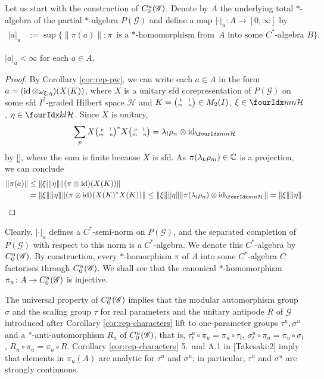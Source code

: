 Let us start with the construction of $C^{u}_{0}(\mathscr{G})$. Denote by $A$ the
underlying total $*$-algebra of the partial $*$-algebra
$P(\mathscr{G})$ and define a map $|\cdot |_{u} \colon A \to [0,\infty]$ by
\begin{align*}
  |a|_{u}&:= \sup \{ \|\pi(a)\| : \pi \text{ is a $*$-homomorphism
    from } A \text{ into some $C^{*}$-algebra } B\}.
\end{align*}
\begin{Lem}
  $|a|_{u}<\infty$ for each $a \in A$. 
\end{Lem}
\begin{proof}
  By Corollary \ref{cor:rep-pw}, we can write each $a\in A$ in the
  form $a=(\operatorname{id} \otimes \omega_{\xi,\eta})(X(K))$, where $X$ is a
  unitary sfd corepresentation of $P(\mathscr{G})$ on some sfd
  $I^{2}$-graded Hilbert space $\mathcal{H}$ and
  $K={\tiny \begin{pmatrix} k \quad l \\ m \quad n\end{pmatrix}}\in M_{2}(I)$, $\xi\in \Gru{\mathcal{H}}{m}{n}$,
  $\eta\in \Gru{\mathcal{H}}{k}{l}$.  Since $X$ is unitary,
  \begin{align*}
    \sum_{p}X\pmat{p}{l}{m}{n}^{*} X\pmat{p}{l}{m}{n}  = \lambda_{l}\rho_{n}
    \otimes \id_{\Gru{\mathcal{H}}{m}{n}}
  \end{align*}
  by \ref{}, where the sum is finite because $X$ is sfd. As
  $\pi(\lambda_{k}\rho_{m})\in \mathbb{C}$ is a projection, we can conclude
  \begin{align*}
    \|\pi(a)\| &\leq \| \xi| \|\eta\| \|(\pi \otimes \id)(X(K))\| \\
    &=\|\xi\|\|\eta\| \|(\pi \otimes \id)(X(K)^{*}X(K))\| \leq
    \|\xi\|\|\eta\| \|\pi(\lambda_{l}\rho_{n}) \otimes
    \id_{\Gru{\mathcal{H}}{m} {n}}\| = \|\xi\|\|\eta\|.  
  \end{align*}
\end{proof}
Clearly, $|\cdot|_{u}$ defines a $C^{*}$-semi-norm on
$P(\mathscr{G})$, and the separated completion of $P(\mathscr{G})$
with respect to this norm is a $C^{*}$-algebra. We denote this
$C^{*}$-algebra by $C^{u}_{0}(\mathscr{G})$. By construction, every $*$-homorphism $\pi$
of $A$ into some $C^{*}$-algebra $C$ factorises through $C^{u}_{0}(\mathscr{G})$. 
We shall see that the canonical $*$-homomorphism $\pi_{u} \colon A \to
C^{u}_{0}(\mathscr{G})$ is injective.
\begin{Rem}
  The universal property of $C^{u}_{0}(\mathscr{G})$ implies that the modular
  automorphism group $\sigma$ and the scaling group $\tau$ for real
  parameters and the unitary antipode $R$ of $\mathscr{G}$ introduced
  after Corollary \ref{cor:rep-characters} lift to one-parameter
  groups $\tau^{u},\sigma^{u}$ and a $*$-anti-automorphism $R_{u}$ of
  $C^{u}_{0}(\mathscr{G})$, that is, $\tau^{u}_{t} \circ \pi_{u}= \pi_{u} \circ \tau_{t}$,
  $\sigma^{u}_{t} \circ \pi_{u} = \pi_{u} \circ \sigma_{t}$, $R_{u}
  \circ \pi_{u} = \pi_{u} \circ R$. Corollary \ref{cor:rep-characters}
  5.\ and A.1 in \cite{} [Takesaki:2]  imply that elements in
  $\pi_{u}(A)$ are analytic for $\tau^{u}$ and $\sigma^{u}$; in
  particular, $\tau^{u}$ and $\sigma^{u}$ are strongly continuous.  
\end{Rem}


